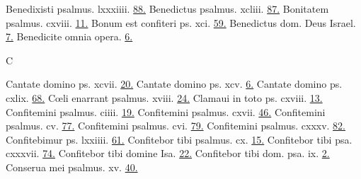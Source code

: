 \documentclass[a5paper,10pt]{book}
\def\oe{œ}
\begin{document}
\begin{multicols}{2}
\newline Benedixisti psalmus. lxxxiiii. \hfill \hyperlink{ps84}{88.}
\newline Benedictus psalmus. xcliii. \hfill \hyperlink{ps143}{87.}
\newline Bonitatem psalmus. cxviii. \hfill \hyperlink{ps118.5}{11.}
\newline Bonum est confiteri ps. xci. \hfill \hyperlink{ps91}{59.}
\newline Benedictus dom. Deus Israel. \hfill \hyperlink{Benedictus}{7.}
\newline Benedicite omnia opera. \hfill \hyperlink{benedicite}{6.}
\newline \vspace{-1.75em}
\begin{center}
\color{red} C
\end{center}
\vspace{-.75em}
\par \noindent Cantate domino ps. xcvii. \hfill \hyperlink{ps97}{20.}
\newline Cantate domino ps. xcv. \hfill \hyperlink{ps95}{6.}
\newline Cantate domino ps. cxlix. \hfill \hyperlink{ps149}{68.}
\newline C\oe li enarrant psalmus. xviii. \hfill \hyperlink{ps18}{24.}
\newline Clamaui in toto ps. cxviii. \hfill \hyperlink{ps118.10}{13.}
\newline Confitemini psalmus. ciiii. \hfill \hyperlink{ps104}{19.}
\newline Confitemini psalmus. cxvii. \hfill \hyperlink{ps117}{46.}
\newline Confitemini psalmus. cv. \hfill \hyperlink{ps105}{77.}
\newline Confitemini psalmus. cvi. \hfill \hyperlink{ps106}{79.}
\newline Confitemini psalmus. cxxxv. \hfill \hyperlink{ps135}{82.}
\newline Confitebimur ps. lxxiiii. \hfill \hyperlink{ps74}{61.}
\newline Confitebor tibi psalmus. cx. \hfill \hyperlink{ps110}{15.}
\newline Confitebor tibi psa. cxxxvii. \hfill \hyperlink{ps137}{74.}
\newline Confitebor tibi domine Isa. \hfill \hyperlink{Isaiah}{22.}
\newline Confitebor tibi dom. psa. ix. \hfill \hyperlink{ps9}{2.}
\newline Conserua mei psalmus. xv. \hfill \hyperlink{ps15}{40.}

\end{multicols}
\end{document}
